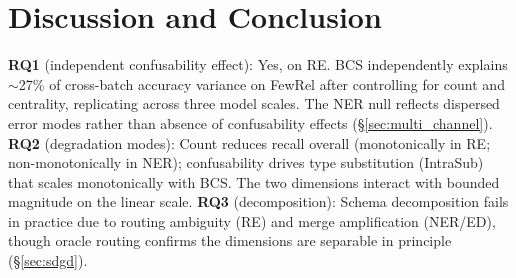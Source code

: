 \section{Discussion and Conclusion}
\label{sec:discussion}

\textbf{RQ1} (independent confusability effect): Yes, on RE. BCS independently explains ${\sim}$27\% of cross-batch accuracy variance on FewRel after controlling for count and centrality, replicating across three model scales. The NER null reflects dispersed error modes rather than absence of confusability effects (\S\ref{sec:multi_channel}).
\textbf{RQ2} (degradation modes): Count reduces recall overall (monotonically in RE; non-monotonically in NER); confusability drives type substitution (IntraSub) that scales monotonically with BCS. The two dimensions interact with bounded magnitude on the linear scale.
\textbf{RQ3} (decomposition): Schema decomposition fails in practice due to routing ambiguity (RE) and merge amplification (NER/ED), though oracle routing confirms the dimensions are separable in principle (\S\ref{sec:sdgd}).

\begin{table}[t]
\centering
\small
\caption{Intra-batch substitution (IntraSub) and missed rates by BCS bin. IntraSub scales monotonically with BCS across all three datasets. DocRED missed rates decrease with BCS, indicating errors shift from omission to substitution.}
\label{tab:error_taxonomy}
\end{table}


